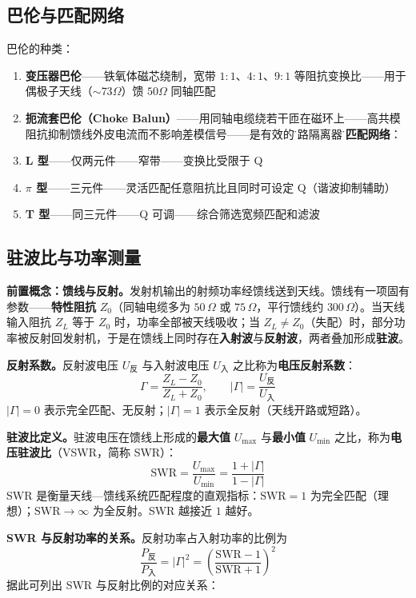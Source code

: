 \documentclass[12pt,UTF8]{ctexbook}
\begin{document}
\subsection{巴伦与匹配网络}

巴伦的种类：
\begin{enumerate}
\item \textbf{变压器巴伦}——铁氧体磁芯绕制，宽带 $1:1$、$4:1$、$9:1$ 等阻抗变换比——用于偶极子天线（$\sim73\Omega$）馈 $50\Omega$ 同轴匹配
\item \textbf{扼流套巴伦（Choke Balun）}——用同轴电缆绕若干匝在磁环上——高共模阻抗抑制馈线外皮电流而不影响差模信号——是有效的\"线路隔离器\"。\textbf{匹配网络}：
\item \textbf{L 型}——仅两元件——窄带——变换比受限于 Q
\item \textbf{$\pi$ 型}——三元件——灵活匹配任意阻抗比且同时可设定 Q（谐波抑制辅助）
\item \textbf{T 型}——同三元件——Q 可调——综合筛选宽频匹配和滤波
\end{enumerate}

\subsection{驻波比与功率测量}

\textbf{前置概念：馈线与反射。}发射机输出的射频功率经馈线送到天线。馈线有一项固有参数——\textbf{特性阻抗} $Z_0$（同轴电缆多为 $50\,\Omega$ 或 $75\,\Omega$，平行馈线约 $300\,\Omega$）。当天线输入阻抗 $Z_L$ 等于 $Z_0$ 时，功率全部被天线吸收；当 $Z_L\neq Z_0$（失配）时，部分功率被反射回发射机，于是在馈线上同时存在\textbf{入射波}与\textbf{反射波}，两者叠加形成\textbf{驻波}。

\textbf{反射系数。}反射波电压 $U_{\text{反}}$ 与入射波电压 $U_{\text{入}}$ 之比称为\textbf{电压反射系数}：
\[
\Gamma = \frac{Z_L - Z_0}{Z_L + Z_0}, \qquad |\Gamma| = \frac{U_{\text{反}}}{U_{\text{入}}}
\]
$|\Gamma|=0$ 表示完全匹配、无反射；$|\Gamma|=1$ 表示全反射（天线开路或短路）。

\textbf{驻波比定义。}驻波电压在馈线上形成的\textbf{最大值} $U_{\max}$ 与\textbf{最小值} $U_{\min}$ 之比，称为\textbf{电压驻波比}（VSWR，简称 SWR）：
\[
\boxed{\;\mathrm{SWR} = \frac{U_{\max}}{U_{\min}} = \frac{1+|\Gamma|}{1-|\Gamma|}\;}
\]
SWR 是衡量天线—馈线系统匹配程度的直观指标：$\mathrm{SWR}=1$ 为完全匹配（理想）；$\mathrm{SWR}\to\infty$ 为全反射。SWR 越接近 $1$ 越好。

\textbf{SWR 与反射功率的关系。}反射功率占入射功率的比例为
\[
\frac{P_{\text{反}}}{P_{\text{入}}} = |\Gamma|^2 = \left(\frac{\mathrm{SWR}-1}{\mathrm{SWR}+1}\right)^2
\]
据此可列出 SWR 与反射比例的对应关系：
\end{document}
